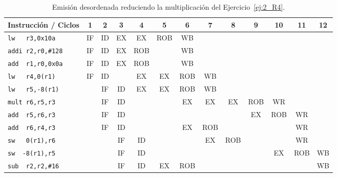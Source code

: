 \begin{ejercicio}
    \begin{table}
        \centering
        \scriptsize
        \begin{tabular}{|l|c|c|c|c|c|c|c|c|c|c|c|c|}
            \hline
            Instrucción / Ciclos & 1 & 2 & 3 & 4 & 5 & 6 & 7 & 8 & 9 & 10 & 11 & 12 \\
            \hline
            \verb|lw   r3,0x10a|        & IF & ID & EX & EX & ROB & WB & & & & & &\\
            \hline        
            \verb|addi r2,r0,#128|      & IF & ID & EX & ROB & & WB & & & & & &\\
            \hline           
            \verb|add  r1,r0,0x0a|      & IF & ID & EX & ROB & &  WB & & & & & & \\
            \hline                        
            \verb|lw   r4,0(r1)|        & IF & ID & & EX & EX & ROB & WB & & & & & \\
            \hline            
            \verb|lw   r5,-8(r1)|       & & IF & ID & EX & EX & ROB & WB & & & && \\
            \hline
            \verb|mult r6,r5,r3|        & & IF & ID & & & EX & EX & EX & ROB & WR & & \\
            \hline
            \verb|add  r5,r6,r3|        & & IF & ID & & & & & & EX & ROB & WR & \\
            \hline
            \verb|add  r6,r4,r3|        & & IF & ID & & & EX & ROB & & & & WR &\\
            \hline            
            \verb|sw   0(r1),r6|        & & & IF & ID & & & EX & ROB & & & WR & \\
            \hline
            \verb|sw  -8(r1),r5|        & & & IF & ID & & & & & & EX & ROB & WB\\
            \hline
            \verb|sub  r2,r2,#16|       & & & IF & ID & EX & ROB & & & & & & WB \\
            \hline
        \end{tabular}
        \caption{Emisión desordenada reduciendo la multiplicación del Ejercicio~\ref{ej:2_R4}.}
        \label{tab:ej3_R4_2}
    \end{table}
\end{ejercicio}

